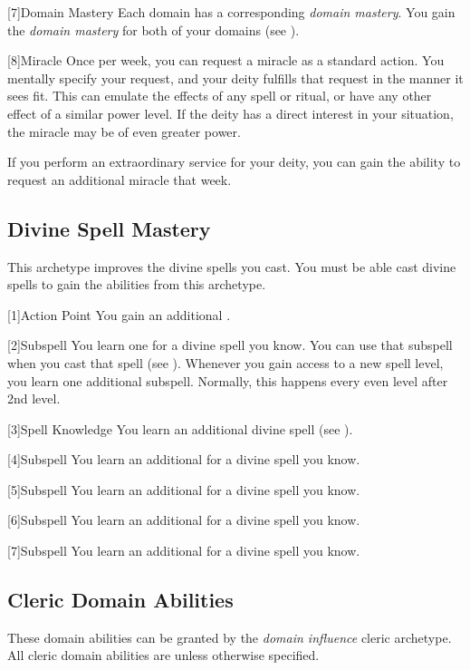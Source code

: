         [7]{Domain Mastery}
        Each domain has a corresponding \textit{domain mastery}.
        You gain the \textit{domain mastery} for both of your domains (see ).

        [8]{Miracle}
        Once per week, you can request a miracle as a standard action.
        You mentally specify your request, and your deity fulfills that request in the manner it sees fit.
        This can emulate the effects of any spell or ritual, or have any other effect of a similar power level.
        If the deity has a direct interest in your situation, the miracle may be of even greater power.

        If you perform an extraordinary service for your deity, you can gain the ability to request an additional miracle that week.

    \subsection{Divine Spell Mastery}
        This archetype improves the divine spells you cast.
        You must be able cast divine spells to gain the abilities from this archetype.

        [1]{Action Point}
        You gain an additional .

        [2]{Subspell}
        You learn one  for a divine spell you know.
        You can use that subspell when you cast that spell (see ).
        Whenever you gain access to a new spell level, you learn one additional subspell.
        Normally, this happens every even level after 2nd level.

        [3]{Spell Knowledge}
        You learn an additional divine spell (see ).

        [4]{Subspell}
        You learn an additional  for a divine spell you know.

        [5]{Subspell}
        You learn an additional  for a divine spell you know.

        [6]{Subspell}
        You learn an additional  for a divine spell you know.

        [7]{Subspell}
        You learn an additional  for a divine spell you know.

    \subsection{Cleric Domain Abilities}\label{Cleric Domain Abilities}
        These domain abilities can be granted by the \textit{domain influence} cleric archetype.
        All cleric domain abilities are  unless otherwise specified.

